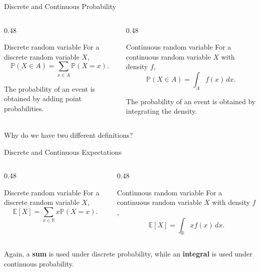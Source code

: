 \documentclass [aspectratio=169]{beamer}
\begin{document}
\begin{frame}{Discrete and Continuous Probability}

\begin{columns}[T]
\begin{column}{0.48\textwidth}
\begin{block}{Discrete random variable}
For a discrete random variable $X$,
\[
    \mathbb P(X \in A)
    =
    \sum_{x \in A} \mathbb P(X=x).
\]

The probability of an event is obtained by adding point probabilities.
\end{block}
\end{column}

\begin{column}{0.48\textwidth}
\begin{block}{Continuous random variable}
For a continuous random variable $X$ with density $f$,
\[
    \mathbb P(X \in A)
    =
    \int_A f(x)\,dx.
\]

The probability of an event is obtained by integrating the density.
\end{block}
\end{column}
\end{columns}

\vspace{4mm}

\begin{center}
\large
Why do we have two different definitions?
\end{center}

\end{frame}

\begin{frame}{Discrete and Continuous Expectations}

\begin{columns}[T]
\begin{column}{0.48\textwidth}
\begin{block}{Discrete random variable}
For a discrete random variable $X$,
\[
    \mathbb E[X]
    =
    \sum_{x\in \mathbb{R}} x \mathbb P(X=x).
\]
\end{block}
\end{column}

\begin{column}{0.48\textwidth}
\begin{block}{Continuous random variable}
For a continuous random variable $X$ with density $f$,
\[
    \mathbb E[X]
    =
    \int_{\mathbb R} x f(x)\,dx.
\]
\end{block}
\end{column}
\end{columns}

\vspace{5mm}

\large
Again, a \textbf{sum} is used under discrete probability, while an \textbf{integral} is used under continuous probability.

\end{frame}
\end{document}
